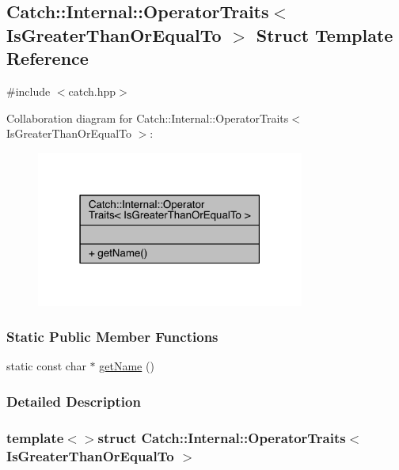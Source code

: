 \hypertarget{a00059}{}\subsection{Catch\+:\+:Internal\+:\+:Operator\+Traits$<$ Is\+Greater\+Than\+Or\+Equal\+To $>$ Struct Template Reference}
\label{a00059}


{\ttfamily \#include $<$catch.\+hpp$>$}



Collaboration diagram for Catch\+:\+:Internal\+:\+:Operator\+Traits$<$ Is\+Greater\+Than\+Or\+Equal\+To $>$\+:\nopagebreak
\begin{figure}[H]
\begin{center}
\leavevmode
\includegraphics[width=250pt]{a00328}
\end{center}
\end{figure}
\subsubsection*{Static Public Member Functions}
\begin{DoxyCompactItemize}
\item 
static const char $\ast$ \hyperlink{a00059_a76b6f6b0dbaf7d19ebb1b4b4891e719e}{get\+Name} ()
\end{DoxyCompactItemize}


\subsubsection{Detailed Description}
\subsubsection*{template$<$$>$struct Catch\+::\+Internal\+::\+Operator\+Traits$<$ Is\+Greater\+Than\+Or\+Equal\+To $>$}



